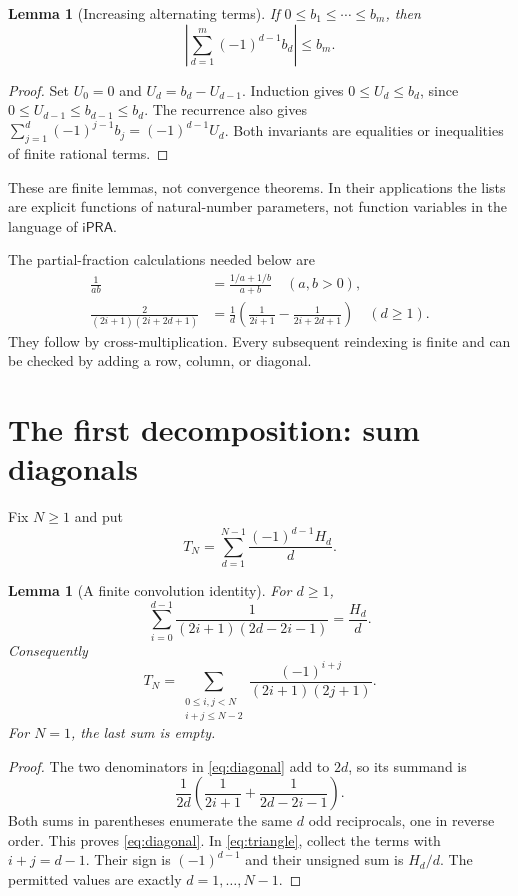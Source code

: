\documentclass[11pt,a4paper]{article}
\newtheorem{lemma}[theorem]{Lemma}
\theoremstyle{remark}\newtheorem{remark}[theorem]{Remark}
\newcommand{\ipra}{\mathsf{iPRA}}
\newcommand{\abs}[1]{\left|#1\right|}
\begin{document}
\begin{lemma}[Increasing alternating terms]\label{lem:increasing}
If $0\le b_1\le\cdots\le b_m$, then
\[
 \abs{\sum_{d=1}^m(-1)^{d-1}b_d}\le b_m.
\]
\end{lemma}
\begin{proof}
Set $U_0=0$ and $U_d=b_d-U_{d-1}$. Induction gives
$0\le U_d\le b_d$, since $0\le U_{d-1}\le b_{d-1}\le b_d$.
The recurrence also gives
$\sum_{j=1}^d(-1)^{j-1}b_j=(-1)^{d-1}U_d$.
Both invariants are equalities or inequalities of finite rational
terms.
\end{proof}

These are finite lemmas, not convergence theorems. In their
applications the lists are explicit functions of natural-number
parameters, not function variables in the language of $\ipra$.

The partial-fraction calculations needed below are
\begin{align}
 \frac1{ab}&=\frac{1/a+1/b}{a+b}\quad(a,b>0),\label{eq:pfplus}\\
 \frac2{(2i+1)(2i+2d+1)}
 &=\frac1d\left(\frac1{2i+1}-\frac1{2i+2d+1}\right)
 \quad(d\ge1).\label{eq:pfminus}
\end{align}
They follow by cross-multiplication. Every subsequent reindexing is
finite and can be checked by adding a row, column, or diagonal.

\section{The first decomposition: sum diagonals}\label{sec:triangle}

Fix $N\ge1$ and put
\begin{equation}\label{eq:TN}
 T_N=\sum_{d=1}^{N-1}\frac{(-1)^{d-1}H_d}{d}.
\end{equation}
\begin{lemma}[A finite convolution identity]\label{lem:diagonal}
For $d\ge1$,
\begin{equation}\label{eq:diagonal}
 \sum_{i=0}^{d-1}\frac1{(2i+1)(2d-2i-1)}=\frac{H_d}{d}.
\end{equation}
Consequently
\begin{equation}\label{eq:triangle}
 T_N=\sum_{\substack{0\le i,j<N\\i+j\le N-2}}
       \frac{(-1)^{i+j}}{(2i+1)(2j+1)}.
\end{equation}
For $N=1$, the last sum is empty.
\end{lemma}
\begin{proof}
The two denominators in \eqref{eq:diagonal} add to $2d$, so its
summand is
\[
 \frac1{2d}\left(\frac1{2i+1}+\frac1{2d-2i-1}\right).
\]
Both sums in parentheses enumerate the same $d$ odd reciprocals,
one in reverse order. This proves \eqref{eq:diagonal}.
In \eqref{eq:triangle}, collect the terms with $i+j=d-1$.
Their sign is $(-1)^{d-1}$ and their unsigned sum is $H_d/d$.
The permitted values are exactly $d=1,\ldots,N-1$.
\end{proof}
\end{document}

